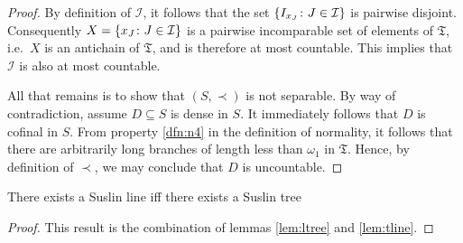 \begin{proof}
	By definition of $\mathcal{I}$, it follows that the set
	$\left\lbrace I_{x_J}\colon J\in\mathcal{I} \right\rbrace$ is pairwise disjoint. Consequently
	$X=\left\lbrace x_J\colon J\in\mathcal{I} \right\rbrace$ is a pairwise incomparable set of elements
	of $\mathfrak{T}$, i.e.\ $X$ is an antichain of $\mathfrak{T}$, and is therefore
	at most countable.  This implies that $\mathcal{I}$ is also at most countable.

    All that remains is to show that $(S,\prec)$ is not separable.  By way of
    contradiction, assume $D\subseteq S$ is dense in $S$.  It immediately
    follows that $D$ is cofinal in $S$.  From property \ref{dfn:n4} in the
    definition of normality, it follows that there are arbitrarily long branches
    of length less than $\omega_1$ in $\mathfrak{T}$.  Hence, by definition of
    $\prec$, we may conclude that $D$ is uncountable.
\end{proof}

\begin{thm}
	There exists a Suslin line iff there exists a Suslin tree
\end{thm}
\begin{proof}
	This result is the combination of lemmas \ref{lem:ltree} and \ref{lem:tline}.
\end{proof}
